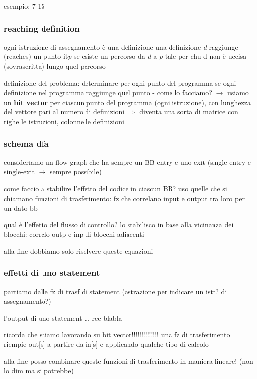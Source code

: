 esempio: 7-15

\subsubsection{reaching definition}

ogni istruzione di assegnamento \`e una definizione
una definizione \textit{d} raggiunge (reaches) un punto it\textit{p} se esiste un percorso da \textit{d} a \textit{p} tale per chu d non \`e uccisa (sovrascritta) lungo quel percorso

definizione del problema: determinare per ogni punto del programma se ogni definizione nel programma raggiunge quel punto - come lo facciamo? $\rightarrow$ usiamo un \textbf{bit vector} per ciascun punto del programma (ogni istruzione), con lunghezza del vettore pari al numero di definizioni $\Rightarrow$ diventa una sorta di matrice con righe le istruzioni, colonne le definizioni

\subsubsection{schema dfa}

consideriamo un flow graph che ha sempre un BB entry e uno exit (single-entry e single-exit $\rightarrow$ sempre possibile)

come faccio a stabilire l'effetto del codice in ciascun BB? uso quelle che si chiamano funzioni di trasferimento: fz che correlano input e output tra loro per un dato bb

qual \`e l'effetto del flusso di controllo? lo stabilisco in base alla vicinanza dei blocchi: correlo outp e inp di blocchi adiacenti

alla fine dobbiamo solo risolvere queste equazioni 

\subsubsection{effetti di uno statement}

partiamo dalle fz di trasf di statement (astrazione per indicare un istr? di assegnamento?)

l'output di uno statement ... rec blabla

ricorda che stiamo lavorando su bit vector!!!!!!!!!!!!!! una fz di trasferimento riempie out[s] a partire da in[s] e applicando qualche tipo di calcolo

alla fine posso combinare queste funzioni di trasferimento in maniera lineare! (non lo dim ma si potrebbe)

